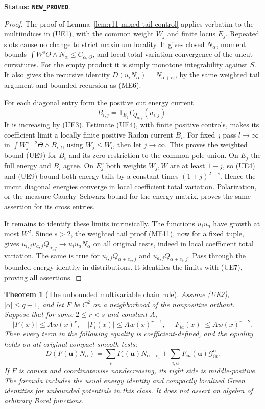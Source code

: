 \documentclass[11pt,a4paper]{article}
\numberwithin{equation}{section}
\newtheorem{theorem}{Theorem}[section]
\theoremstyle{definition}
\theoremstyle{remark}
\begin{document}
\noindent\textbf{Status: \texttt{NEW\_PROVED}}.

\begin{proof}
The proof of Lemma~\ref{lem:r11-mixed-tail-control} applies verbatim
to the multiindices in (UE1), with the common weight $W_j$ and
finite locus $E_j$.  Repeated slots cause no change to strict maximum
locality.  It gives closed $N_\alpha$, moment bounds
$\int W^s\Theta\wedge N_\alpha\leq C_{\alpha,\Theta}$,
and local total-variation convergence of the uncut curvatures.
For the empty product it is simply monotone integrability against $S$.
It also gives the recursive identity
$D(u_iN_\alpha)=N_{\alpha+e_i}$, by the same weighted tail
argument and bounded recursion as (ME6).

For each diagonal entry form the positive cut energy current
\[
 B_{i,j}=\mathbf1_{E_j}
                   \Gamma_{Q_{\alpha,j}}(u_{i,j}).
\]
It is increasing by (UE3).  Estimate (UE4), with finite positive
controls, makes its coefficient limit a locally finite positive
Radon current $B_i$.  For fixed $j$ pass $l\to\infty$ in
$\int W_j^{s-2}\Theta\wedge B_{i,l}$, using $W_j\leq W_l$,
then let $j\to\infty$.  This proves the weighted bound (UE9)
for $B_i$ and its zero restriction to the common pole union.
On $E_j$ the full energy and $B_i$ agree.  On $E_j^c$ both
weights $W_j,W$ are at least $1+j$, so (UE4) and (UE9) bound
both energy tails by a constant times $(1+j)^{2-s}$.  Hence the
uncut diagonal energies converge in local coefficient total variation.
Polarization, or the measure Cauchy--Schwarz bound for the energy
matrix, proves the same assertion for its cross entries.

It remains to identify these limits intrinsically.  The functions
$u_i u_a$ have growth at most $W^2$.  Since $s>2$, the weighted
tail proof (ME11), now for a fixed tuple, gives
$u_{i,j}u_{a,j}Q_{\alpha,j}\to u_i u_aN_\alpha$ on all original
tests, indeed in local coefficient total variation.  The same is true
for $u_{i,j}Q_{\alpha+e_a,j}$ and $u_{a,j}Q_{\alpha+e_i,j}$.
Pass through the bounded energy identity in distributions.  It
identifies the limits with (UE7), proving all assertions.
\end{proof}

\begin{theorem}[The unbounded multivariable chain rule]
\label{thm:r11-unbounded-multivariable-chain}
Assume (UE2), $|\alpha|\leq q-1$, and let $F$ be $C^2$ on a
neighborhood of the nonpositive orthant.  Suppose that for some
$2\leq r<s$ and constant $A$,
\[
 |F(x)|\leq A w(x)^r,\quad
 |F_i(x)|\leq A w(x)^{r-1},\quad
 |F_{ia}(x)|\leq A w(x)^{r-2}.
 \tag{UE10}
\]
Then every term in the following equality is coefficient-defined,
and the equality holds on all original compact smooth tests:
\[
 D(F(\mathbf u)N_\alpha)
   =\sum_i F_i(\mathbf u)N_{\alpha+e_i}
      +\sum_{i,a}F_{ia}(\mathbf u)\mathcal G^\alpha_{ia}.
 \tag{UE11}
\]
If $F$ is convex and coordinatewise nondecreasing, its right side is
middle-positive.  The formula includes the usual energy identity and
compactly localized Green identities for unbounded potentials in this
class.  It does not assert an algebra of arbitrary Borel functions.
\end{theorem}
\end{document}
